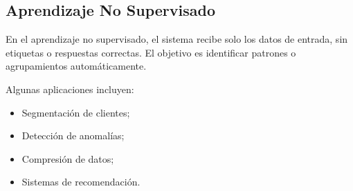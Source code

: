 \subsection{Aprendizaje No Supervisado}

En el aprendizaje no supervisado, el sistema recibe solo los datos de entrada, sin etiquetas
o respuestas correctas. El objetivo es identificar patrones o agrupamientos automáticamente.

Algunas aplicaciones incluyen:

\begin{itemize}
    \item Segmentación de clientes;
    \item Detección de anomalías;
    \item Compresión de datos;
    \item Sistemas de recomendación.
\end{itemize} 